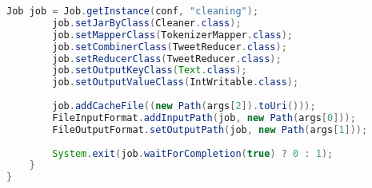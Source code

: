 \begin{lstlisting}[language=Java,basicstyle=\tiny,caption=Stemming.java]
        Job job = Job.getInstance(conf, "cleaning");
        job.setJarByClass(Cleaner.class);
        job.setMapperClass(TokenizerMapper.class);
        job.setCombinerClass(TweetReducer.class);
        job.setReducerClass(TweetReducer.class);
        job.setOutputKeyClass(Text.class);
        job.setOutputValueClass(IntWritable.class);
        
        job.addCacheFile((new Path(args[2]).toUri()));
        FileInputFormat.addInputPath(job, new Path(args[0]));
        FileOutputFormat.setOutputPath(job, new Path(args[1]));
        
        System.exit(job.waitForCompletion(true) ? 0 : 1);
    }
}

\end{lstlisting}